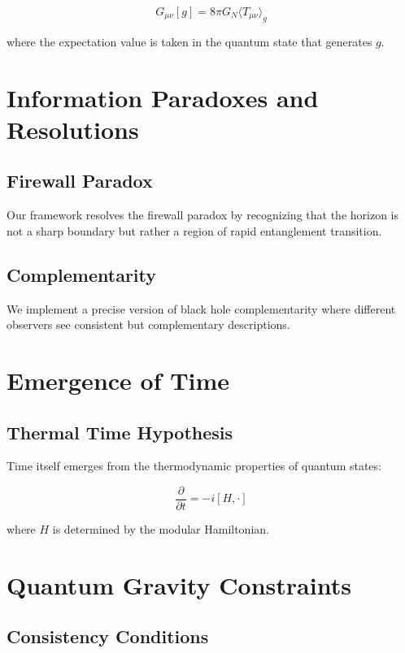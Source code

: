 \documentclass[12pt,a4paper]{article}
\begin{document}
\begin{equation}
G_{\mu\nu}[g] = 8\pi G_N \langle T_{\mu\nu} \rangle_g
\end{equation}

where the expectation value is taken in the quantum state that generates $g$.

\section{Information Paradoxes and Resolutions}

\subsection{Firewall Paradox}

Our framework resolves the firewall paradox by recognizing that the horizon is not a sharp boundary but rather a region of rapid entanglement transition.

\subsection{Complementarity}

We implement a precise version of black hole complementarity where different observers see consistent but complementary descriptions.

\section{Emergence of Time}

\subsection{Thermal Time Hypothesis}

Time itself emerges from the thermodynamic properties of quantum states:

\begin{equation}
\frac{\partial}{\partial t} = -i[H, \cdot]
\end{equation}

where $H$ is determined by the modular Hamiltonian.

\section{Quantum Gravity Constraints}

\subsection{Consistency Conditions}
\end{document}
